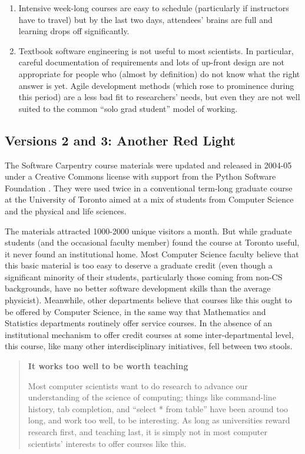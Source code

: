 \documentclass[10pt,a4paper,twocolumn]{article}
\begin{document}
\begin{enumerate}

\item
  Intensive week-long courses are easy to schedule (particularly if
  instructors have to travel) but by the last two days, attendees'
  brains are full and learning drops off significantly.

\item
  Textbook software engineering is not useful to most scientists. In
  particular, careful documentation of requirements and lots of
  up-front design are not appropriate for people who (almost by
  definition) do not know what the right answer is yet. Agile
  development methods (which rose to prominence during this period)
  are a less bad fit to researchers' needs, but even they are not well
  suited to the common ``solo grad student'' model of working.

\end{enumerate}

\subsection*{Versions 2 and 3: Another Red Light}

The Software Carpentry course materials were updated and released in
2004-05 under a Creative Commons license with support from the
Python Software Foundation \cite{wilson2006b}. They were used twice in
a conventional term-long graduate course at the University of Toronto
aimed at a mix of students from Computer Science and the physical and
life sciences.

The materials attracted 1000-2000 unique visitors a month.  But while
graduate students (and the occasional faculty member) found the course
at Toronto useful, it never found an institutional home.  Most
Computer Science faculty believe that this basic material is too easy
to deserve a graduate credit (even though a significant minority of
their students, particularly those coming from non-CS backgrounds,
have no better software development skills than the average
physicist). Meanwhile, other departments believe that courses like
this ought to be offered by Computer Science, in the same way that
Mathematics and Statistics departments routinely offer service
courses.  In the absence of an institutional mechanism to offer credit
courses at some inter-departmental level, this course, like many other
interdisciplinary initiatives, fell between two stools.

\begin{quote}
\textbf{It works too well to be worth teaching}

Most computer scientists want to do research to advance our
understanding of the science of computing; things like command-line
history, tab completion, and ``select * from table'' have been around
too long, and work too well, to be interesting. As long as
universities reward research first, and teaching last, it is simply
not in most computer scientists' interests to offer courses like this.
\end{quote}
\end{document}

